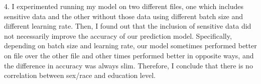 \documentclass[12pt,letterpaper]{article}
\begin{document}
4. I experimented running my model on two different files, one which includes sensitive data and the other without those data using different batch size and different learning rate. Then, I found out that the inclusion of sensitive data did not necessarily improve the accuracy of our prediction model. Specifically, depending on batch size and learning rate, our model sometimes performed better on file over the other file and other times performed better in opposite ways, and the difference in accuracy was always slim. Therefore, I conclude that there is no correlation between sex/race and education level.
\end{document}
